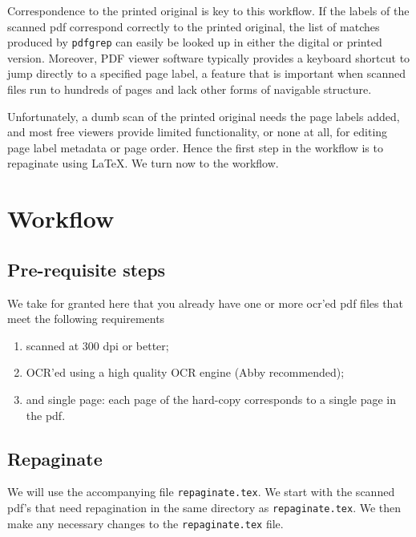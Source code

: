 \documentclass[
  letterpaper,
]{tufte-handout}
\providecommand{\tightlist}{%
  \setlength{\itemsep}{0pt}\setlength{\parskip}{0pt}}
\begin{document}
Correspondence to the printed original is key to this workflow. If the
labels of the scanned pdf correspond correctly to the printed original,
the list of matches produced by \texttt{pdfgrep} can easily
be looked up in either the digital or printed version. Moreover, PDF
viewer software typically provides a keyboard shortcut to jump directly
to a specified page label, a feature that is important when scanned
files run to hundreds of pages and lack other forms of navigable
structure.

Unfortunately, a dumb scan of the printed original needs the page labels
added, and most free viewers provide limited functionality, or none at
all, for editing page label metadata or page order. Hence the first step
in the workflow is to repaginate using \LaTeX. We turn now to the
workflow.

\section{Workflow}\label{workflow}

\subsection{Pre-requisite steps}\label{pre-requisite-steps}

We take for granted here that you already have one or more ocr'ed pdf
files that meet the following requirements

\begin{enumerate}
\def\labelenumi{\arabic{enumi}.}
\tightlist
\item
  scanned at 300 dpi or better;
\item
  OCR'ed using a high quality OCR engine (Abby recommended);
\item
  and single page: each page of the hard-copy corresponds to a single
  page in the pdf.
\end{enumerate}

\subsection{Repaginate}\label{repaginate}

We will use the accompanying file \texttt{repaginate.tex}.
We start with the scanned pdf's that need repagination in the same
directory as \texttt{repaginate.tex}. We then make any
necessary changes to the \texttt{repaginate.tex} file.
\end{document}
